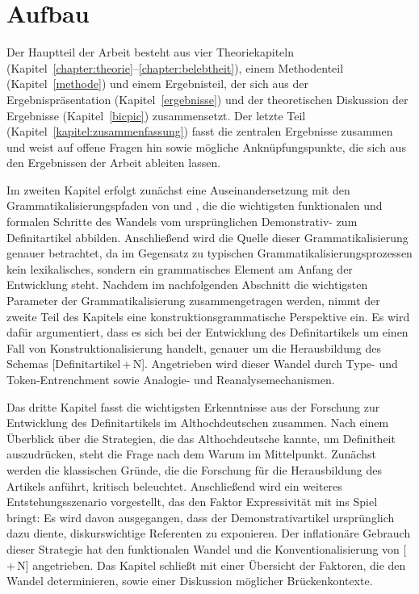 \section{Aufbau} 

Der Hauptteil der Arbeit besteht aus vier Theoriekapiteln  (Kapitel~\ref{chapter:theorie}--\ref{chapter:belebtheit}), einem Methodenteil (Kapitel~\ref{methode}) und einem Ergebnisteil, der sich aus der Ergebnispräsentation (Kapitel~\ref{ergebnisse}) und der theoretischen Diskussion der Ergebnisse (Kapitel~\ref{bicpic}) zusammensetzt. Der letzte Teil (Kapitel~\ref{kapitel:zusammenfassung}) fasst die zentralen Ergebnisse zusammen und weist auf offene Fragen hin sowie mögliche Anknüpfungspunkte, die sich aus den Ergebnissen der Arbeit ableiten lassen. 

Im zweiten Kapitel erfolgt zunächst eine Auseinandersetzung mit den Grammatikalisierungspfaden von \textcite{Greenberg1978} und \textcite{Lehmann2015}, die die wichtigsten funktionalen und formalen Schritte des Wandels vom ursprünglichen Demonstrativ- zum Definitartikel abbilden. Anschließend wird die Quelle dieser Grammatikalisierung genauer betrachtet, da im Gegensatz zu typischen Grammatikalisierungsprozessen kein lexikalisches, sondern ein grammatisches Element am Anfang der Entwicklung steht. Nachdem im nachfolgenden Abschnitt die wichtigsten Parameter der Grammatikalisierung zusammengetragen werden, nimmt der zweite Teil des Kapitels eine konstruktionsgrammatische Perspektive ein. Es wird dafür argumentiert, dass es sich bei der Entwicklung des Definitartikels um einen Fall von Konstruktionalisierung handelt, genauer um die Herausbildung des Schemas [Definitartikel\,+\,N]. Angetrieben wird dieser Wandel durch Type- und Token-Entrenchment sowie Analogie- und Reanalysemechanismen. 

Das dritte Kapitel fasst die wichtigsten Erkenntnisse aus der Forschung zur Entwicklung des Definitartikels im Althochdeutschen zusammen. Nach einem Überblick über die Strategien, die das Althochdeutsche kannte, um Definitheit auszudrücken, steht die Frage nach dem Warum im Mittelpunkt. Zunächst werden die klassischen Gründe, die die Forschung für die Herausbildung des Artikels anführt, kritisch beleuchtet. Anschließend wird ein weiteres Entstehungsszenario vorgestellt, das den Faktor Expressivität mit ins Spiel bringt: Es wird davon ausgegangen, dass der Demonstrativartikel ursprünglich dazu diente, diskurswichtige Referenten zu exponieren. Der inflationäre Gebrauch dieser Strategie hat den funktionalen Wandel und die Konventionalisierung von [\,+\,N] angetrieben. Das Kapitel schließt mit einer Übersicht der Faktoren, die den Wandel determinieren, sowie einer Diskussion möglicher Brückenkontexte. 

